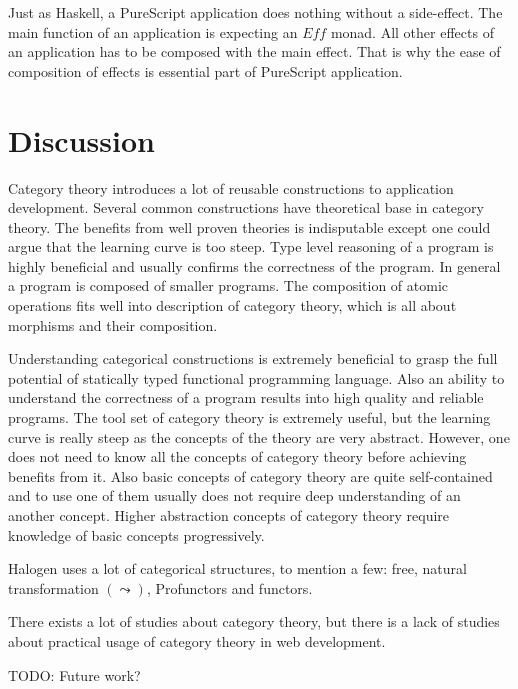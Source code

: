 \documentclass[article]{aaltoseries}
\begin{document}
      Just as Haskell, a PureScript application does nothing without a
      side-effect. The main function of an application is expecting an $Eff$
      monad. All other effects of an application has to be composed with the
      main effect. That is why the ease of composition of effects is essential
      part of PureScript application.


\section{Discussion}

Category theory introduces a lot of reusable constructions to application
development. Several common constructions have theoretical base in category
theory. The benefits from well proven theories is indisputable except one could
argue that the learning curve is too steep. Type level reasoning of a program is
highly beneficial and usually confirms the correctness of the program. In
general a program is composed of smaller programs. The composition of atomic
operations fits well into description of category theory, which is all about
morphisms and their composition.
 
Understanding categorical constructions is extremely beneficial to grasp the
full potential of statically typed functional programming language. Also an
ability to understand the correctness of a program results into high quality and
reliable programs. The tool set of category theory is extremely useful, but the
learning curve is really steep as the concepts of the theory are very abstract.
However, one does not need to know all the concepts of category theory before
achieving benefits from it. Also basic concepts of category theory are quite
self-contained and to use one of them usually does not require deep
understanding of an another concept. Higher abstraction concepts of category
theory require knowledge of basic concepts progressively.
 
Halogen uses a lot of categorical structures, to mention a few: free, natural
transformation $(\leadsto)$, Profunctors and functors.
 
There exists a lot of studies about category theory, but there is a lack of
studies about practical usage of category theory in web development.

TODO: Future work?

\end{document}
